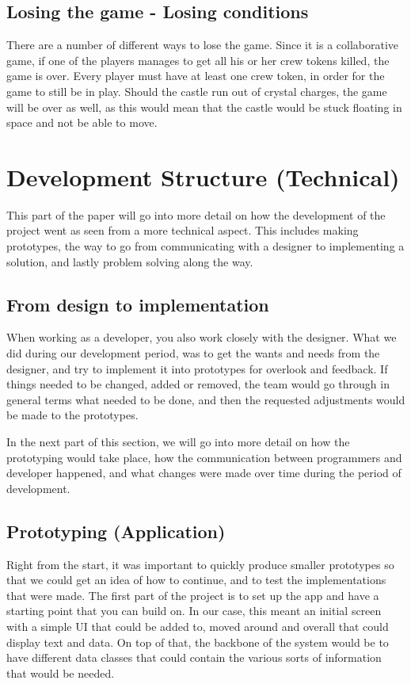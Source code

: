 \subsection{Losing the game - Losing conditions}
There are a number of different ways to lose the game. Since it is a collaborative game, if one of the players manages to get all his or her crew tokens killed, the game is over. Every player must have at least one crew token, in order for the game to still be in play.
Should the castle run out of crystal charges, the game will be over as well, as this would mean that the castle would be stuck floating in space and not be able to move.

\section{Development Structure (Technical)}
This part of the paper will go into more detail on how the development of the project went as seen from a more technical aspect. This includes making prototypes, the way to go from communicating with a designer to implementing a solution, and lastly problem solving along the way.
\subsection{From design to implementation}
When working as a developer, you also work closely with the designer. What we did during our development period, was to get the wants and needs from the designer, and try to implement it into prototypes for overlook and feedback. 
If things needed to be changed, added or removed, the team would go through in general terms what needed to be done, and then the requested adjustments would be made to the prototypes.

In the next part of this section, we will go into more detail on how the prototyping would take place, how the communication between programmers and developer happened, and what changes were made over time during the period of development.

\subsection{Prototyping (Application)}
Right from the start, it was important to quickly produce smaller prototypes so that we could get an idea of how to continue, and to test the implementations that were made. The first part of the project is to set up the app and have a starting point that you can build on. In our case, this meant an initial screen with a simple UI that could be added to, moved around and overall that could display text and data. On top of that, the backbone of the system would be to have different data classes that could contain the various sorts of information that would be needed.


